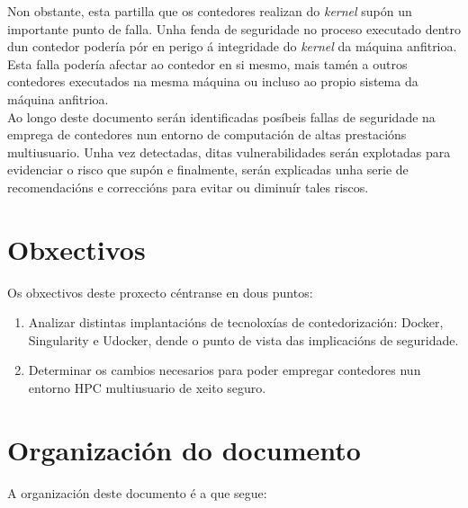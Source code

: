 Non obstante, esta partilla que os contedores realizan do \textit{kernel} supón un importante punto de falla. Unha fenda de seguridade no proceso executado dentro dun contedor podería pór en perigo á integridade do \textit{kernel} da máquina anfitrioa. Esta falla podería afectar ao contedor en si mesmo, mais tamén a outros contedores executados na mesma máquina ou incluso ao propio sistema da máquina anfitrioa.\\

Ao longo deste documento serán identificadas posíbeis fallas de seguridade na emprega de contedores nun entorno de computación de altas prestacións multiusuario. Unha vez detectadas, ditas vulnerabilidades serán explotadas para evidenciar o risco que supón e finalmente, serán explicadas unha serie de recomendacións e correccións para evitar ou diminuír tales riscos.

\section{Obxectivos}

Os obxectivos deste proxecto céntranse en dous puntos:

\begin{enumerate}
    \item Analizar distintas implantacións de tecnoloxías de contedorización: Docker, Singularity e Udocker, dende o punto de vista das implicacións de seguridade.
    \item Determinar os cambios necesarios para poder empregar contedores nun entorno \gls{HPC} multiusuario de xeito seguro.
\end{enumerate}

\section{Organización do documento}

A organización deste documento é a que segue:

